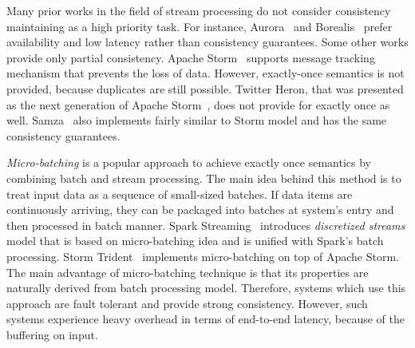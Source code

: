 
\label {fs-related-seciton}

Many prior works in the field of stream processing do not consider consistency maintaining as a high priority task. For instance, Aurora~\cite{Abadi:2003:ANM:950481.950485} and Borealis~\cite{abadi2005design} prefer availability and low latency rather than consistency guarantees. Some other works provide only partial consistency. Apache Storm~\cite{apache:storm} supports message tracking mechanism that prevents the loss of data. However, exactly-once semantics is not provided, because duplicates are still possible. Twitter Heron, that was presented as the next generation of Apache Storm~\cite{Kulkarni:2015:THS:2723372.2742788}, does not provide for exactly once as well. Samza~\cite{Noghabi:2017:SSS:3137765.3137770} also implements fairly similar to Storm model and has the same consistency guarantees.  

{\it Micro-batching} is a popular approach to achieve exactly once semantics by combining batch and stream processing. The main idea behind this method is to treat input data as a sequence of small-sized batches. If data items are continuously arriving, they can be packaged into batches at system's entry and then processed in batch manner. Spark Streaming~\cite{Zaharia:2012:DSE:2342763.2342773} introduces {\it discretized streams} model that is based on micro-batching idea and is unified with Spark's batch processing. Storm Trident~\cite{apache:storm:trident} implements micro-batching on top of Apache Storm. The main advantage of micro-batching technique is that its properties are naturally derived from batch processing model. Therefore, systems which use this approach are fault tolerant and provide strong consistency. However, such systems experience heavy overhead in terms of end-to-end latency, because of the buffering on input.   

